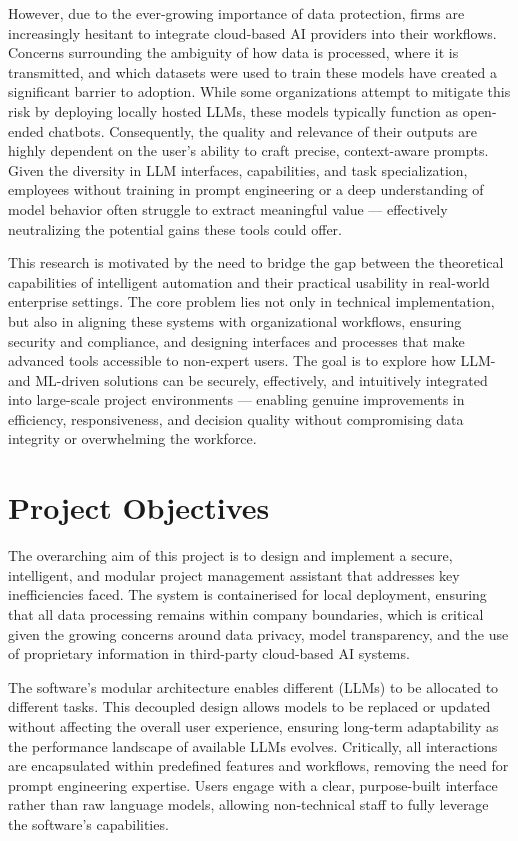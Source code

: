 \documentclass[12pt,a4paper]{report}
\begin{document}
However, due to the ever-growing importance of data protection, firms are increasingly hesitant to integrate cloud-based AI providers into their workflows. Concerns surrounding the ambiguity of how data is processed, where it is transmitted, and which datasets were used to train these models have created a significant barrier to adoption. While some organizations attempt to mitigate this risk by deploying locally hosted LLMs, these models typically function as open-ended chatbots. Consequently, the quality and relevance of their outputs are highly dependent on the user's ability to craft precise, context-aware prompts. Given the diversity in LLM interfaces, capabilities, and task specialization, employees without training in prompt engineering or a deep understanding of model behavior often struggle to extract meaningful value — effectively neutralizing the potential gains these tools could offer.

This research is motivated by the need to bridge the gap between the theoretical capabilities of intelligent automation and their practical usability in real-world enterprise settings. The core problem lies not only in technical implementation, but also in aligning these systems with organizational workflows, ensuring security and compliance, and designing interfaces and processes that make advanced tools accessible to non-expert users. The goal is to explore how LLM- and ML-driven solutions can be securely, effectively, and intuitively integrated into large-scale project environments — enabling genuine improvements in efficiency, responsiveness, and decision quality without compromising data integrity or overwhelming the workforce.


\section{Project Objectives}
The overarching aim of this project is to design and implement a secure, intelligent, and modular project management assistant that addresses key inefficiencies faced. The system is containerised for local deployment, ensuring that all data processing remains within company boundaries, which is critical given the growing concerns around data privacy, model transparency, and the use of proprietary information in third-party cloud-based AI systems.

The software's modular architecture enables different (LLMs) to be allocated to different tasks. This decoupled design allows models to be replaced or updated without affecting the overall user experience, ensuring long-term adaptability as the performance landscape of available LLMs evolves. Critically, all interactions are encapsulated within predefined features and workflows, removing the need for prompt engineering expertise. Users engage with a clear, purpose-built interface rather than raw language models, allowing non-technical staff to fully leverage the software's capabilities.
\end{document}
